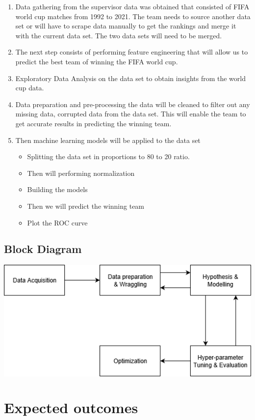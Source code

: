 \documentclass[11pt,a4paper]{scrartcl}
\begin{document}
\begin{enumerate}
\item Data gathering from the supervisor data was obtained that consisted of FIFA world cup matches from 1992 to 2021. The team needs to source another data set or will have to scrape data manually to get the rankings and merge it with the current data set. The two data sets will need to be merged.
\item The next step consists of performing feature engineering that will allow us to predict the best team of winning the FIFA world cup.
\item Exploratory Data Analysis on the data set to obtain insights from the world cup data.
\item Data preparation and pre-processing the data will be cleaned to filter out any missing data, corrupted data from the data set. This will enable the team to get accurate results in predicting the winning team.
\item Then machine learning models will be applied to the data set
	\begin{itemize}
	\item Splitting the data set in proportions to 80 to 20 ratio.
	\item Then will performing normalization
	\item Building the models
	\item Then we will predict the winning team
	\item Plot the ROC curve
	\end{itemize}
\end{enumerate}

\subsection{Block Diagram}
\includegraphics[height=6cm,width=\linewidth]{methodflow.PNG}


\section{Expected outcomes}
\end{document}
